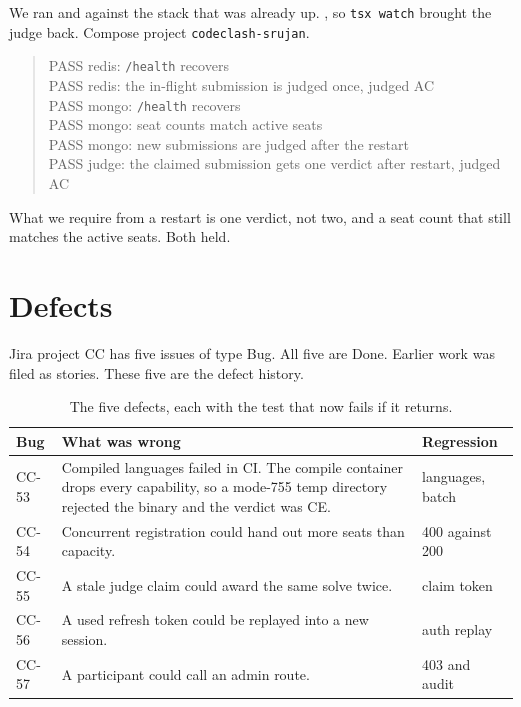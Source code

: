 \documentclass[11pt,a4paper]{article}
\begin{document}
We ran  and  against the stack that was already up. , so \texttt{tsx watch} brought the judge back. Compose project \texttt{codeclash-srujan}.

\begin{quote}\small
PASS \quad redis: \texttt{/health} recovers\\
PASS \quad redis: the in-flight submission is judged once, judged AC\\
PASS \quad mongo: \texttt{/health} recovers\\
PASS \quad mongo: seat counts match active seats\\
PASS \quad mongo: new submissions are judged after the restart\\
PASS \quad judge: the claimed submission gets one verdict after restart, judged AC
\end{quote}

What we require from a restart is one verdict, not two, and a seat count that still matches the active seats. Both held.

\section{Defects}
\label{sec:bugs}

Jira project CC has five issues of type Bug. All five are Done. Earlier work was filed as stories. These five are the defect history.

\begin{table}[ht]
\centering
\caption{The five defects, each with the test that now fails if it returns.}
\label{tab:bugs}
{\small
\begin{tabularx}{\textwidth}{@{}l Y l@{}}
\toprule
Bug & What was wrong & Regression \\
\midrule
CC-53 &
Compiled languages failed in CI. The compile container drops every capability, so a mode-755 temp directory rejected the binary and the verdict was CE. &
languages, batch \\
CC-54 &
Concurrent registration could hand out more seats than capacity. &
400 against 200 \\
CC-55 &
A stale judge claim could award the same solve twice. &
claim token \\
CC-56 &
A used refresh token could be replayed into a new session. &
auth replay \\
CC-57 &
A participant could call an admin route. &
403 and audit \\
\bottomrule
\end{tabularx}
}
\end{table}
\end{document}
